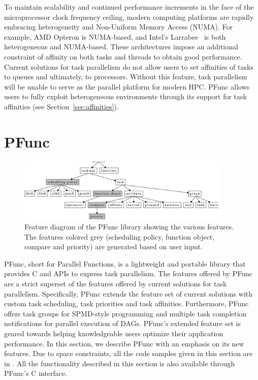 \documentclass{sig-alternate}
\begin{document}
To maintain scalability and continued performance increments in the face of the
microprocessor clock frequency ceiling, modern computing platforms are rapidly
embracing heterogeneity and Non-Uniform Memory Access (NUMA).  For example, AMD
Opteron is NUMA-based, and Intel's Larrabee~\cite{seiler2008} is both
heterogeneous and NUMA-based. These architectures impose an additional
constraint of affinity on both tasks and threads to obtain good performance.
Current solutions for task parallelism do not allow users to set affinities of
tasks to queues and ultimately, to processors. 
%
Without this feature, task parallelism will be unable to serve as the parallel
platform for modern HPC. PFunc allows users to fully
exploit heterogeneous environments through its support for task
affinities (see Section~\ref{sec:affinities}).

\section{PFunc}
\label{sec:pfunc}

\begin{figure}[t]
\centering
\includegraphics[width=0.90\textwidth]{figs/pfunc}
\caption{Feature diagram of the PFunc library showing the various features.
The features colored grey (scheduling policy, function object, compare and
priority) are generated based on user input.}
\label{fig:pfunc}
\end{figure}

PFunc, short for Parallel Functions, is a lightweight and portable library that
provides C and \Cpp{} APIs to express task parallelism. The features offered by
PFunc are a strict superset of the features offered by current solutions for
task parallelism.  Specifically, PFunc extends the feature set of current
solutions with custom task scheduling, task priorities and task affinities.
Furthermore, PFunc offers task groups for SPMD-style programming and multiple
task completion notifications for parallel execution of DAGs.  PFunc's extended
feature set is geared towards helping knowledgeable users optimize their
application performance. In this section, we describe PFunc with an emphasis on
its new features.  Due to space constraints, all the code samples given in this
section are in \Cpp{}. All the functionality described in this section is also
available through PFunc's C interface.
\end{document}
